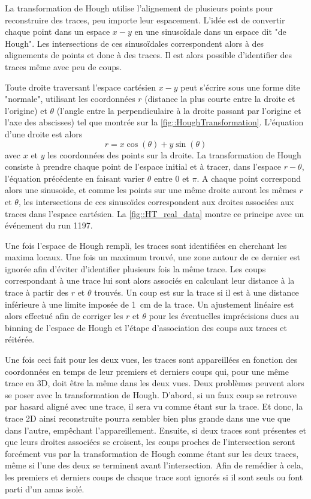       La transformation de Hough utilise l'alignement de plusieurs points pour reconstruire des traces, peu importe leur espacement. L'idée est de convertir chaque point dans un espace $x-y$ en une sinusoïdale dans un espace dit "de Hough". Les intersections de ces sinusoïdales correspondent alors à des alignements de points et donc à des traces. Il est alors possible d'identifier des traces même avec peu de coups.

      Toute droite traversant l'espace cartésien $x-y$ peut s'écrire sous une forme dite "normale", utilisant les coordonnées $r$ (distance la plus courte entre la droite et l'origine) et $\theta$ (l'angle entre la perpendiculaire à la droite passant par l'origine et l'axe des abscisses) tel que montrée sur la \autoref{fig::HoughTransformation}. L'équation d'une droite est alors
      \begin{equation}\label{eq::HT}
        r=x\cos(\theta)+y\sin(\theta)
      \end{equation}
      avec $x$ et $y$ les coordonnées des points sur la droite. La transformation de Hough consiste à prendre chaque point de l'espace initial et à tracer, dans l'espace $r-\theta$, l'équation précédente en faisant varier $\theta$ entre 0 et $\pi$. A chaque point correspond alors une sinusoïde, et comme les points sur une même droite auront les mêmes $r$ et $\theta$, les intersections de ces sinusoïdes correspondent aux droites associées aux traces dans l'espace cartésien. La \autoref{fig::HT_real_data} montre ce principe avec un événement du run 1197.

      Une fois l'espace de Hough rempli, les traces sont identifiées en cherchant les maxima locaux. Une fois un maximum trouvé, une zone autour de ce dernier est ignorée afin d'éviter d'identifier plusieurs fois la même trace. Les coups correspondant à une trace lui sont alors associés en calculant leur distance à la trace à partir des $r$ et $\theta$ trouvés. Un coup est sur la trace si il est à une distance inférieure à une limite imposée de \SI{1}{\centi\meter} de la trace. Un ajustement linéaire est alors effectué afin de corriger les $r$ et $\theta$ pour les éventuelles imprécisions dues au binning de l'espace de Hough et l'étape d'association des coups aux traces et réitérée.

      Une fois ceci fait pour les deux vues, les traces sont appareillées en fonction des coordonnées en temps de leur premiers et derniers coups qui, pour une même trace en 3D, doit être la même dans les deux vues. Deux problèmes peuvent alors se poser avec la transformation de Hough. D'abord, si un faux coup se retrouve par hasard aligné avec une trace, il sera vu comme étant sur la trace. Et donc, la trace 2D ainsi reconstruite pourra sembler bien plus grande dans une vue que dans l'autre, empêchant l'appareillement. Ensuite, si deux traces sont présentes et que leurs droites associées se croisent, les coups proches de l'intersection seront forcément vus par la transformation de Hough comme étant sur les deux traces, même si l'une des deux se terminent avant l'intersection. Afin de remédier à cela, les premiers et derniers coups de chaque trace sont ignorés si il sont seuls ou font parti d'un amas isolé.

